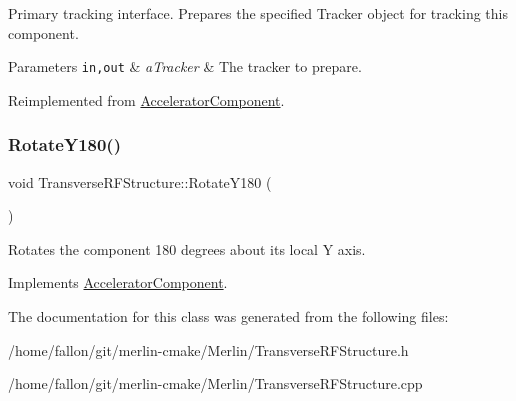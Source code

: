 Primary tracking interface. Prepares the specified Tracker object for tracking this component. 
\begin{DoxyParams}[1]{Parameters}
\mbox{\tt in,out}  & {\em a\+Tracker} & The tracker to prepare. \\
\hline
\end{DoxyParams}


Reimplemented from \hyperlink{classAcceleratorComponent_ab897c54689ac946f40c3ad0716ddd4bb}{Accelerator\+Component}.

\mbox{\label{classTransverseRFStructure_a1b016853604d6d2f1c21af600ff52fe0}} 
\subsubsection{\texorpdfstring{Rotate\+Y180()}{RotateY180()}}
{\footnotesize\ttfamily void Transverse\+R\+F\+Structure\+::\+Rotate\+Y180 (\begin{DoxyParamCaption}{ }\end{DoxyParamCaption})\hspace{0.3cm}{\ttfamily [virtual]}}

Rotates the component 180 degrees about its local Y axis. 

Implements \hyperlink{classAcceleratorComponent_a8bf0d39b56578ca99f286ca1504b9072}{Accelerator\+Component}.



The documentation for this class was generated from the following files\+:\begin{DoxyCompactItemize}
\item 
/home/fallon/git/merlin-\/cmake/\+Merlin/Transverse\+R\+F\+Structure.\+h\item 
/home/fallon/git/merlin-\/cmake/\+Merlin/Transverse\+R\+F\+Structure.\+cpp\end{DoxyCompactItemize}
